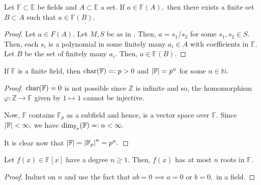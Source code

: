 \begin{cor} \label{cor:FAdescfinite}
    Let $\mathbb{F} \subset \mathbb{E}$ be fields and $A \subset \mathbb{E}$ a set. If $a \in \mathbb{F}(A),$ then there exists a finite set $B \subset A$ such that $a \in \mathbb{F}(B).$
\end{cor}

\begin{proof} 
    Let $a \in F(A).$ Let $M, S$ be as in . Then, $a = s_1/s_2$ for some $s_1, s_2 \in S.$ Then, each $s_i$ is a polynomial in some finitely many $a_i \in A$ with coefficients in $\mathbb{F}.$ Let $B$ be the set of finitely many $a_i.$ Then, $a \in \mathbb{F}(B).$
\end{proof}

\begin{prop}
    If $\mathbb{F}$ is a finite field, then $\operatorname{char}(\mathbb{F}) =\vcentcolon p > 0$ and ${\left\lvert \mathbb{F} \right\lvert} = p^n$ for some $n \in \mathbb{N}.$
\end{prop}
\begin{proof} 
    $\operatorname{char}(\mathbb{F}) = 0$ is not possible since $\mathbb{Z}$ is infinite and so, the homomorphism $\varphi : \mathbb{Z} \to \mathbb{F}$ given by $1 \mapsto 1$ cannot be injective.

    Now, $\mathbb{F}$ contains $\mathbb{F}_p$ as a subfield and hence, is a vector space over $\mathbb{F}.$ Since ${\left\lvert \mathbb{F} \right\lvert} < \infty,$ we have $\dim_{\mathbb{F}_p}(\mathbb{F}) =\vcentcolon n < \infty.$

    It is clear now that ${\left\lvert \mathbb{F} \right\lvert} = {\left\lvert \mathbb{F}_p \right\lvert}^n = p^n.$
\end{proof}

\begin{thm}
    Let $f(x) \in \mathbb{F}[x]$ have a degree $n \ge 1.$ Then, $f(x)$ has at most $n$ roots in $\mathbb{F}.$
\end{thm}
\begin{proof} 
    Induct on $n$ and use the fact that $ab = 0 \implies a = 0$ or $b = 0,$ in a field.
\end{proof}

